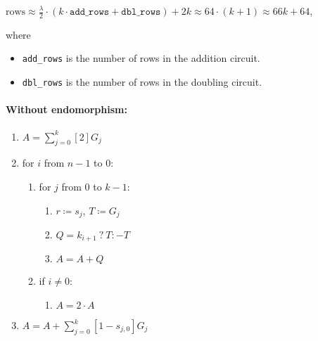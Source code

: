 \begin{center}
	$\text{rows} \approx \frac{\lambda}{2} \cdot (k \cdot \texttt{add\_rows} + \texttt{dbl\_rows}) + 2k \approx 64 \cdot (k + 1) \approx 66k + 64$,
\end{center}
where
\begin{itemize}
	\item \texttt{add\_rows} is the number of rows in the addition circuit. 
	\item \texttt{dbl\_rows} is the number of rows in the doubling circuit. 
\end{itemize}

\paragraph{Without endomorphism:} 

\begin{enumerate}
	\item $A = \sum\limits_{j = 0}^{k} [2]G_j$
	\item for $i$ from $n - 1$ to $0$:
	\begin{enumerate}
		\item for $j$ from $0$ to $k-1$:
		\begin{enumerate}
			\item $r \coloneqq s_j$, $T \coloneqq G_j$
			\item $Q = k_{i + 1} \: ? \: T : -T$
			\item $A = A + Q$
		\end{enumerate}
		\item if $i \neq 0$:
		\begin{enumerate}
			\item $A = 2 \cdot A$
		\end{enumerate}
	\end{enumerate}
	\item $A = A + \sum\limits_{j = 0}^{k} [1 - s_{j, 0}]G_j$ 
\end{enumerate}